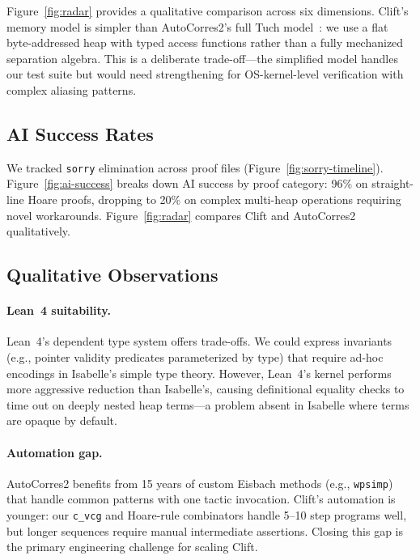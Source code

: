 \documentclass[sigconf,nonacm,screen]{acmart}
\begin{document}
Figure~\ref{fig:radar} provides a qualitative comparison across
six dimensions. Clift's memory model is simpler than AutoCorres2's
full Tuch model~\cite{tuch2009types}: we use a flat byte-addressed heap with
typed access functions rather than a fully mechanized separation
algebra. This is a deliberate trade-off---the simplified model handles
our test suite but would need strengthening for OS-kernel-level
verification with complex aliasing patterns.





\subsection{AI Success Rates}

We tracked \texttt{sorry} elimination across proof files
(Figure~\ref{fig:sorry-timeline}). Figure~\ref{fig:ai-success} breaks
down AI success by proof category: 96\% on straight-line Hoare proofs,
dropping to 20\% on complex multi-heap operations requiring novel
workarounds. Figure~\ref{fig:radar} compares Clift and AutoCorres2
qualitatively.



\subsection{Qualitative Observations}

\paragraph{Lean~4 suitability.}
Lean~4's dependent type system offers trade-offs.
We could express invariants (e.g., pointer validity
predicates parameterized by type) that require ad-hoc
encodings in Isabelle's simple type theory. However,
Lean~4's kernel performs more aggressive reduction than
Isabelle's, causing definitional equality checks to time out on
deeply nested heap terms---a problem absent in Isabelle where
terms are opaque by default.

\paragraph{Automation gap.}
AutoCorres2 benefits from 15 years of custom Eisbach methods
(e.g., \texttt{wpsimp}) that handle common patterns with one tactic
invocation. Clift's automation is younger: our \texttt{c\_vcg} and
Hoare-rule combinators handle 5--10 step programs well, but
longer sequences require manual intermediate assertions. Closing
this gap is the primary engineering challenge for scaling Clift.
\end{document}
